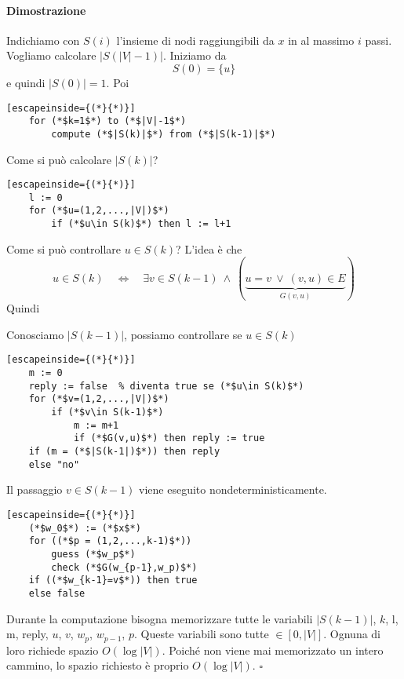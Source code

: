 \paragraph{Dimostrazione} Indichiamo con $S(i)$ l'insieme di nodi raggiungibili da $x$ in al massimo $i$ passi. Vogliamo calcolare $|S(|V|-1)|$. Iniziamo da
$$
    S(0) = \{u\}
$$
e quindi $|S(0)|=1$. Poi
\begin{lstlisting}[escapeinside={(*}{*)}]
    for (*$k=1$*) to (*$|V|-1$*)
        compute (*$|S(k)|$*) from (*$|S(k-1)|$*)
\end{lstlisting}
Come si può calcolare $|S(k)|$? 
\begin{lstlisting}[escapeinside={(*}{*)}]
    l := 0
    for (*$u=(1,2,...,|V|)$*)
        if (*$u\in S(k)$*) then l := l+1
\end{lstlisting}
Come si può controllare $u\in S(k)$? L'idea è che 
$$
u\in S(k)
\quad\Leftrightarrow\quad
\exists v\in S(k-1) ~\land~ (\underbrace{u=v ~\lor~ (v,u)\in E}_{G(v,u)})
$$
Quindi
\begin{center}
\end{center}
Conosciamo $|S(k-1)|$, possiamo controllare se $u\in S(k)$
\begin{lstlisting}[escapeinside={(*}{*)}]
    m := 0
    reply := false  % diventa true se (*$u\in S(k)$*)
    for (*$v=(1,2,...,|V|)$*)
        if (*$v\in S(k-1)$*)
            m := m+1
            if (*$G(v,u)$*) then reply := true
    if (m = (*$|S(k-1|)$*)) then reply 
    else "no"
\end{lstlisting}
Il passaggio $v\in S(k-1)$ viene eseguito nondeterministicamente.
\begin{lstlisting}[escapeinside={(*}{*)}]
    (*$w_0$*) := (*$x$*)
    for ((*$p = (1,2,...,k-1)$*))
        guess (*$w_p$*)
        check (*$G(w_{p-1},w_p)$*)
    if ((*$w_{k-1}=v$*)) then true 
    else false
\end{lstlisting}
Durante la computazione bisogna memorizzare tutte le variabili $|S(k-1)|$, $k$, l, m, reply, $u$, $v$, $w_p$, $w_{p-1}$, $p$. Queste variabili sono tutte $\in[0,|V|]$. Ognuna di loro richiede spazio $O(\log|V|)$. Poiché non viene mai memorizzato un intero cammino, lo spazio richiesto è proprio $O(\log|V|)$. \hfill$\square$

